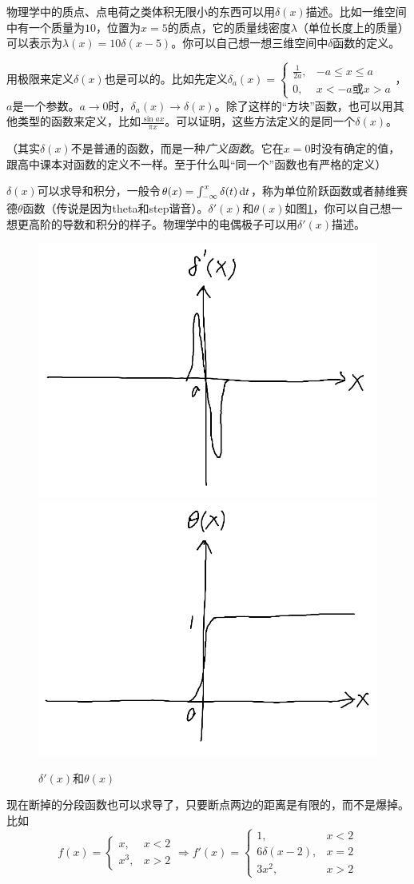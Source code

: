 物理学中的质点、点电荷之类体积无限小的东西可以用$\delta(x)$描述。比如一维空间中有一个质量为$10$，位置为$x=5$的质点，它的质量线密度$\lambda$（单位长度上的质量）可以表示为$\lambda(x)=10 \delta(x-5)$。你可以自己想一想三维空间中$\delta$函数的定义。

用极限来定义$\delta(x)$也是可以的。比如先定义$\delta_a(x)=\begin{cases} \frac{1}{2 a}, &-a \le x \le a \\ 0, &x<-a \text{或} x>a \end{cases}$，$a$是一个参数。$a \rightarrow 0$时，$\delta_a(x) \rightarrow \delta(x)$。除了这样的“方块”函数，也可以用其他类型的函数来定义，比如$\frac{\sin a x}{\pi x}$。可以证明，这些方法定义的是同一个$\delta(x)$。

（其实$\delta(x)$不是普通的函数，而是一种\emph{广义函数}。它在$x=0$时没有确定的值，跟高中课本对函数的定义不一样。至于什么叫“同一个”函数也有严格的定义）

$\delta(x)$可以求导和积分，一般令$\theta(x)=\int_{-\infty}^x \delta(t) \mathop{}\!\mathrm{d} t$，称为单位阶跃函数或者赫维赛德$\theta$函数（传说是因为theta和step谐音）。$\delta'(x)$和$\theta(x)$如图\ref{fig-delta-d-x}，你可以自己想一想更高阶的导数和积分的样子。物理学中的电偶极子可以用$\delta'(x)$描述。
\begin{figure}[htb]
\centering
\includegraphics[width=0.33\linewidth]{fig/delta-d-x.png}
\includegraphics[width=0.33\linewidth]{fig/theta-x.png}
\caption{$\delta'(x)$和$\theta(x)$}
\label{fig-delta-d-x}
\end{figure}

现在断掉的分段函数也可以求导了，只要断点两边的距离是有限的，而不是爆掉。比如
\begin{equation*}
f(x)=\begin{cases}
x, &x<2 \\
x^3, &x>2
\end{cases} \Rightarrow f'(x)=\begin{cases}
1, &x<2 \\
6 \delta(x-2), &x=2 \\
3x^2, &x>2
\end{cases}
\end{equation*}

